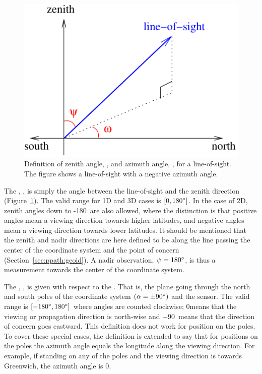 \begin{figure}[!t]
 \begin{center}
  \begin{minipage}[c]{0.6\textwidth}
   \includegraphics*[width=0.99\hsize]{Figs/fm_definitions/za_and_aa_angles}
  \end{minipage}%
  \begin{minipage}[c]{0.4\textwidth}
   \caption{Definition of zenith angle, \ZntAng, and azimuth angle, 
       \AzmAng, for a line-of-sight. The figure shows a line-of-sight
       with a negative azimuth angle.}
   \label{fig:fm_defs:los}
  \end{minipage}
 \end{center}
\end{figure}           
 
The , \ZntAng, is simply the angle between the
line-of-sight and the zenith direction (Figure~\ref{fig:fm_defs:los}).
The valid range for 1D and 3D cases is $[0,180^\circ]$. In the case
of 2D, zenith angles down to -180\degree\ are also allowed, where the
distinction is that positive angles mean a viewing direction towards
higher latitudes, and negative angles mean a viewing direction towards
lower latitudes. It should be mentioned that the zenith and nadir
directions are here defined to be along the line passing the center of
the coordinate system and the point of concern
(Section~\ref{sec:ppath:geoid}). A nadir observation,
$\psi=180^\circ$, is thus a measurement towards the center of the
coordinate system.

The , \AzmAng, is given with respect to the
.  That is, the plane going through the
north and south poles of the coordinate system $(\alpha=\pm90^\circ)$
and the sensor. The valid range is $[-180^\circ,180^\circ]$ where
angles are counted clockwise; 0\degree means that the viewing or
propagation direction is north-wise and +90\degree\ means that the
direction of concern goes eastward. This definition does not work for
position on the poles. To cover these special cases, the definition is
extended to say that for positions on the poles the azimuth angle
equals the longitude along the viewing direction. For example, if
standing on any of the poles and the viewing direction is towards
Greenwich, the azimuth angle is 0\degree.

